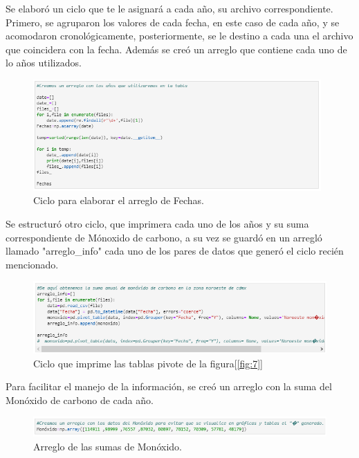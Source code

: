 \documentclass[12pt]{article}
\begin{document}
    Se elaboró un ciclo que te le asignará a cada año, su archivo correspondiente. Primero, se agruparon los valores de cada fecha, en este caso de cada año, y se acomodaron cronológicamente, posteriormente, se le destino a cada una el archivo que coincidera con la fecha. Además se creó un arreglo que contiene cada uno de lo años utilizados. 
         \begin{figure}[h!] 
          \centering 
            \includegraphics[width=11cm]{Pred6.png}
                \caption{Ciclo para elaborar el arreglo de Fechas.}
                \label{fig:8}
                 \end{figure}  
     
    Se estructuró otro ciclo, que imprimera cada uno de los años y su suma correspondiente de Mónoxido de carbono, a su vez se guardó en un arregló llamado "arreglo\_info" cada uno de los pares de datos que generó el ciclo recién mencionado.
        \begin{figure}[h!] 
          \centering 
            \includegraphics[width=12cm]{Pred7.png}
                \caption{Ciclo que imprime las tablas pivote de la figura[\ref{fig:7}]}
                \label{fig:9}
                 \end{figure}  
    
    Para facilitar el manejo de la información, se creó un arreglo con la suma del Monóxido de carbono de cada año. 
         \begin{figure}[h!] 
          \centering 
            \includegraphics[width=12cm]{Pred8.png}
                \caption{Arreglo de las sumas de Monóxido.}
                \label{fig:10}
                 \end{figure}  
    
\end{document}
